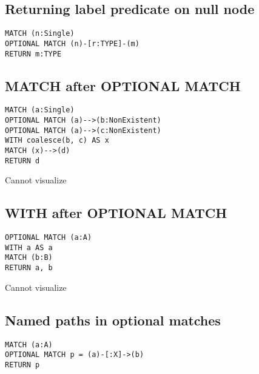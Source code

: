 \subsection{Returning label predicate on null node}

\begin{lstlisting}
MATCH (n:Single)
OPTIONAL MATCH (n)-[r:TYPE]-(m)
RETURN m:TYPE
\end{lstlisting}

\subsection{MATCH after OPTIONAL MATCH}

\begin{lstlisting}
MATCH (a:Single)
OPTIONAL MATCH (a)-->(b:NonExistent)
OPTIONAL MATCH (a)-->(c:NonExistent)
WITH coalesce(b, c) AS x
MATCH (x)-->(d)
RETURN d
\end{lstlisting}

Cannot visualize
\subsection{WITH after OPTIONAL MATCH}

\begin{lstlisting}
OPTIONAL MATCH (a:A)
WITH a AS a
MATCH (b:B)
RETURN a, b
\end{lstlisting}

Cannot visualize
\subsection{Named paths in optional matches}

\begin{lstlisting}
MATCH (a:A)
OPTIONAL MATCH p = (a)-[:X]->(b)
RETURN p
\end{lstlisting}

